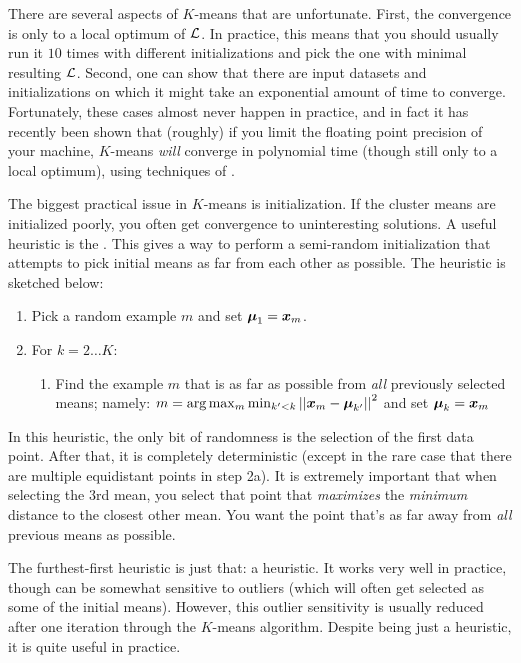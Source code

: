 There are several aspects of $K$-means that are unfortunate.  First,
the convergence is only to a local optimum of $\mathcal{L}$.  In practice,
this means that you should usually run it $10$ times with different
initializations and pick the one with minimal resulting $\mathcal{L}$.
Second, one can show that there are input datasets and initializations
on which it might take an exponential amount of time to converge.
Fortunately, these cases almost never happen in practice, and in fact
it has recently been shown that (roughly) if you limit the floating
point precision of your machine, $K$-means \emph{will} converge in
polynomial time (though still only to a local optimum), using
techniques of .

The biggest practical issue in $K$-means is initialization.  If the
cluster means are initialized poorly, you often get convergence to
uninteresting solutions.  A useful heuristic is the
.  This gives a way to perform a
semi-random initialization that attempts to pick initial means as far
from each other as possible.  The heuristic is sketched below:
%
\begin{enumerate}
  \item Pick a random example $m$ and set $\boldsymbol{\mu}_1 = {\boldsymbol{x}}_m$.
  \item For $k = 2 \dots K$:
    \begin{enumerate}
      \item Find the example $m$ that is as far as possible from
        \emph{all} previously selected means; namely: 
          $m = \arg\max_m \min_{k' < k} \left\vert\left\vert  {\boldsymbol{x}}_m - \boldsymbol{\mu}_{k'}  \right\vert\right\vert^2$
          and set $\boldsymbol{\mu}_k = {\boldsymbol{x}}_m$
    \end{enumerate}
\end{enumerate}
%
In this heuristic, the only bit of randomness is the selection of the
first data point.  After that, it is completely deterministic (except
in the rare case that there are multiple equidistant points in step
2a).  It is extremely important that when selecting the $3$rd mean,
you select that point that \emph{maximizes} the \emph{minimum}
distance to the closest other mean.  You want the point that's as far
away from \emph{all} previous means as possible.

The furthest-first heuristic is just that: a heuristic.  It works very
well in practice, though can be somewhat sensitive to outliers (which
will often get selected as some of the initial means).  However, this
outlier sensitivity is usually reduced after one iteration through the
$K$-means algorithm.  Despite being just a heuristic, it is quite
useful in practice.

